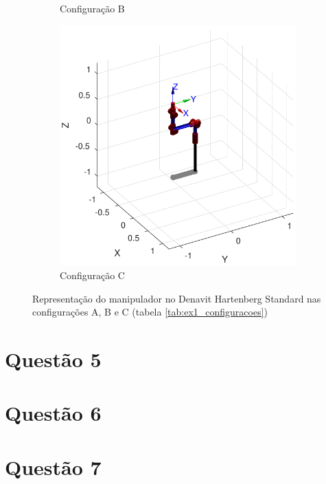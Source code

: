\documentclass[a4paper,11pt]{article}
\theoremstyle{mytheor}
\begin{document}
\begin{figure}[!ht]
\begin{minipage}{\linewidth}
\begin{subfigure}[b]{0.45\textwidth}
    \caption{Configuração B}
    \end{subfigure}
  \end{minipage}
  \begin{minipage}{\linewidth}
  \centering
    \begin{subfigure}[b]{0.45\textwidth}
    \includegraphics[width=1\textwidth]{figs/ex4_c.pdf}
    \caption{Configuração C}
    \end{subfigure}
  \end{minipage}
\caption{Representação do manipulador no Denavit Hartenberg Standard nas configurações A, B e C (tabela \ref{tab:ex1_configuracoes})}
\label{fig:ex4_configuracoes}
\end{figure}



\section*{Questão 5}
\section*{Questão 6}
\section*{Questão 7}
\end{document}

